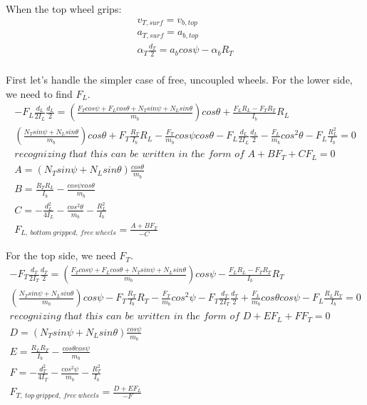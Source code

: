 \documentclass[10pt,letterpaper]{article}
\begin{document}
When the top wheel grips:
\begin{align}
	v_{T,surf} = v_{b,top} \nonumber \\
	a_{T,surf} = a_{b,top} \nonumber \\
	\alpha_{T} \frac{d_T}{2} = a_{b} cos \psi - \alpha_{b} R_T \\
\end{align}

First let's handle the simpler case of free, uncoupled wheels. For the lower side, we need to find $F_L$.
\begin{align}
	- F_L \frac{d_L}{2 I_L} \frac{d_L}{2} = (\frac{F_T cos \psi + F_L cos \theta + N_T sin \psi + N_L sin \theta}{m_b}) cos \theta + \frac{F_L R_L - F_T R_T}{I_b} R_L \\
	(\frac{N_T sin \psi + N_L sin \theta}{m_b}) cos \theta + F_T \frac{R_T}{I_b} R_L - \frac{F_T}{m_b} cos \psi cos \theta - F_L \frac{d_L}{2 I_L} \frac{d_L}{2} - \frac{F_L}{m_b} cos^2 \theta - F_L \frac{R_L^2}{I_b} = 0\\
	\textit{recognizing that this can be written in the form of } A + B F_T + C F_L = 0 \\
	A = (N_T sin \psi + N_L sin \theta) \frac{cos \theta}{m_b} \\
	B = \frac{R_T R_L}{I_b} - \frac{cos \psi cos \theta}{m_b} \\
	C = - \frac{d_L^2}{4 I_L} - \frac{cos^2 \theta}{m_b} - \frac{R_L^2}{I_b} \\
	F_{L,\ bottom\ gripped,\ free\ wheels} = \frac{A + B F_T}{- C}
\end{align}

For the top side, we need $F_T$.
\begin{align}
	- F_T \frac{d_T}{2 I_T} \frac{d_T}{2} = (\frac{F_T cos \psi + F_L cos \theta + N_T sin \psi + N_L sin \theta}{m_b}) cos \psi - \frac{F_L R_L - F_T R_T}{I_b} R_T \\
	(\frac{N_T sin \psi + N_L sin \theta}{m_b}) cos \psi - F_T \frac{R_T}{I_b} R_T - \frac{F_T}{m_b} cos^2 \psi - F_T \frac{d_T}{2 I_T} \frac{d_T}{2} + \frac{F_L}{m_b} cos \theta cos \psi - F_L \frac{R_L R_T}{I_b} = 0\\
	\textit{recognizing that this can be written in the form of } D + E F_L + F F_T = 0 \\
	D = (N_T sin \psi + N_L sin \theta) \frac{cos \psi}{m_b} \\
	E = \frac{R_L R_T}{I_b} - \frac{cos \theta cos \psi}{m_b} \\
	F = - \frac{d_T^2}{4 I_T} - \frac{cos^2 \psi}{m_b} - \frac{R_T^2}{I_b} \\
	F_{T,\ top\ gripped,\ free\ wheels} = \frac{D + E F_L}{- F}
\end{align}
\end{document}
